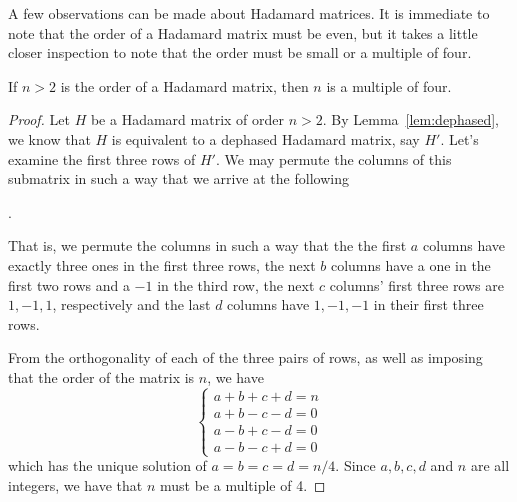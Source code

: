 A few observations can be made about Hadamard matrices. It is immediate to note that the order of a Hadamard matrix must be even, but it takes a little closer inspection to note that the order must be small or a multiple of four.

\begin{lemma} \label{lem:mult-4}
 If $n > 2$ is the order of a Hadamard matrix, then $n$ is a multiple of four.
 \begin{proof}
  Let $H$ be a Hadamard matrix of order $n > 2$. By Lemma~\ref{lem:dephased}, we know that $H$ is equivalent to a dephased Hadamard matrix, say $H'$. Let's examine the first three rows of $H'$. We may permute the columns of this submatrix in such a way that we arrive at the following

 \begin{center}
 .
 \end{center}

\noindent That is, we permute the columns in such a way that the the first $a$ columns have exactly three ones in the first three rows, the next $b$ columns have a one in the first two rows and a $-1$ in the third row, the next $c$ columns' first three rows are $1, -1, 1$, respectively and the last $d$ columns have $1, -1, -1$ in their first three rows.
  
   From the orthogonality of each of the three pairs of rows, as well as imposing that the order of the matrix is $n$, we have
$$\begin{cases}
  a + b + c + d = n \\
  a + b - c - d = 0 \\
  a - b + c - d = 0 \\
  a - b - c + d = 0
 \end{cases}$$
 which has the unique solution of $a = b = c = d = n/4$. Since $a, b, c, d$ and $n$ are all integers, we have that $n$ must be a multiple of 4.
 \end{proof}
\end{lemma}

